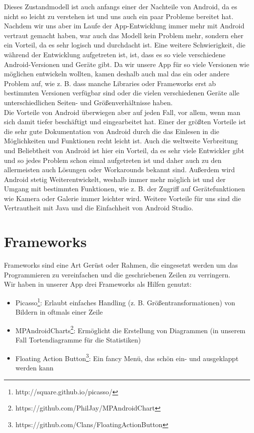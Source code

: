 Dieses Zustandmodell ist auch anfangs einer der Nachteile von Android, da es nicht so leicht zu verstehen ist und uns auch ein paar Probleme bereitet hat. Nachdem wir uns aber im Laufe der App-Entwicklung immer mehr mit Android vertraut gemacht haben, war auch das Modell kein Problem mehr, sondern eher ein Vorteil, da es sehr logisch und durchdacht ist. Eine weitere Schwierigkeit, die während der Entwicklung aufgetreten ist, ist, dass es so viele verschiedene Android-Versionen und Geräte gibt. Da wir unsere App für so viele Versionen wie möglichen entwickeln wollten, kamen deshalb auch mal das ein oder andere Problem auf, wie z. B. dass manche Libraries oder Frameworks erst ab bestimmten Versionen verfügbar sind oder die vielen verschiedenen Geräte alle unterschiedlichen Seiten- und Größenverhältnisse haben.\\
Die Vorteile von Android überwiegen aber auf jeden Fall, vor allem, wenn man sich damit tiefer beschäftigt und eingearbeitet hat. Einer der größten Vorteile ist die sehr gute Dokumentation von Android durch die das Einlesen in die Möglichkeiten und Funktionen recht leicht ist. Auch die weltweite Verbreitung und Beliebtheit von Android ist hier ein Vorteil, da es sehr viele Entwickler gibt und so jedes Problem schon eimal aufgetreten ist und daher auch zu den allermeisten auch Lösungen oder Workarounds bekannt sind.
Außerdem wird Android stetig Weiterentwickelt, weshalb immer mehr möglich ist und der Umgang mit bestimmten Funktionen, wie z. B. der Zugriff auf Gerätefunktionen wie Kamera oder Galerie immer leichter wird.
Weitere Vorteile für uns sind die Vertrautheit mit Java und die Einfachheit von Android Studio.

\section{Frameworks}
\label{sec:grundlagen:frameworks}
Frameworks sind eine Art Gerüst oder Rahmen, die eingesetzt werden um das Programmieren zu vereinfachen und die geschriebenen Zeilen zu verringern.\\
Wir haben in unserer App drei Frameworks als Hilfen genutzt:
\begin{itemize}
\item Picasso\footnote{http://square.github.io/picasso/}: Erlaubt einfaches Handling (z. B. Größentransformationen) von Bildern in oftmals einer Zeile
\item MPAndroidCharts\footnote{https://github.com/PhilJay/MPAndroidChart}: Ermöglicht die Erstellung von Diagrammen (in unserem Fall Tortendiagramme für die Statistiken)
\item Floating Action Button\footnote{https://github.com/Clans/FloatingActionButton}: Ein fancy Menü, das schön ein- und ausgeklappt werden kann
\end{itemize}



















